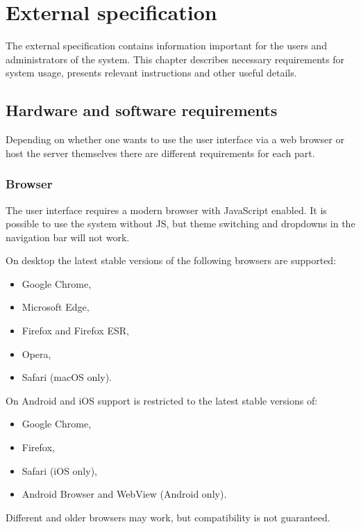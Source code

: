 \chapter{External specification}

The external specification contains information important for the users and administrators of the system. This chapter describes necessary requirements for system usage, presents relevant instructions and other useful details.

\section{Hardware and software requirements}

Depending on whether one wants to use the user interface via a web browser or host the server themselves there are different requirements for each part.

\subsection{Browser}

The user interface requires a modern browser with JavaScript enabled. It is possible to use the system without JS, but theme switching and dropdowns in the navigation bar will not work.

On desktop the latest stable versions of the following browsers are supported:

\begin{itemize}
    \item Google Chrome,
    \item Microsoft Edge,
    \item Firefox and Firefox ESR,
    \item Opera,
    \item Safari (macOS only).
\end{itemize}

On Android and iOS support is restricted to the latest stable versions of:

\begin{itemize}
    \item Google Chrome,
    \item Firefox,
    \item Safari (iOS only),
    \item Android Browser and WebView (Android only).
\end{itemize}

Different and older browsers may work, but compatibility is not guaranteed.

